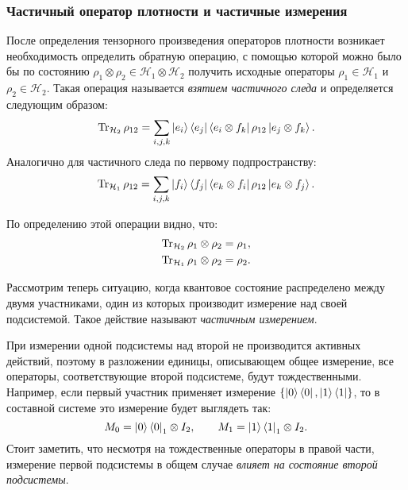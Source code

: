 \subsubsection{Частичный оператор плотности и частичные измерения}
После определения тензорного произведения операторов плотности возникает необходимость определить обратную операцию, с помощью которой можно было бы по состоянию $\rho_1 \otimes \rho_2 \in \mathcal{H}_1 \otimes \mathcal{H}_2$ получить исходные операторы $\rho_1 \in \mathcal{H}_1$ и $\rho_2 \in \mathcal{H}_2$. 
Такая операция называется \textit{взятием частичного следа} и определяется следующим образом:
\begin{equation} \operatorname{Tr}_{\mathcal{H}_2}\rho_{12} = \sum_{i,j,k} \left| e_i \right\rangle\left\langle e_j \right| \left\langle e_i \otimes f_k \right| \rho_{12} \left| e_j \otimes f_k \right\rangle. \end{equation}
Аналогично для частичного следа по первому подпространству:
\begin{equation} \operatorname{Tr}_{\mathcal{H}_1}\rho_{12} = \sum_{i,j,k} \left| f_i \right\rangle\left\langle f_j \right| \left\langle e_k \otimes f_i \right| \rho_{12} \left| e_k \otimes f_j \right\rangle. \end{equation}

По определению этой операции видно, что:
\begin{eqnarray}
\operatorname{Tr}_{\mathcal{H}_2} \rho_1 \otimes \rho_2 = \rho_1, \nonumber\\
\operatorname{Tr}_{\mathcal{H}_1} \rho_1 \otimes \rho_2 = \rho_2.
\end{eqnarray}

Рассмотрим теперь ситуацию, когда квантовое состояние распределено между двумя участниками, один из которых производит измерение над своей подсистемой. Такое действие называют \textit{частичным измерением}.

При измерении одной подсистемы над второй не производится активных действий, поэтому в разложении единицы, описывающем общее измерение, все операторы, соответствующие второй подсистеме, будут тождественными. Например, если первый участник применяет измерение $\{\left| 0 \right\rangle\left\langle 0 \right|, \left| 1 \right\rangle\left\langle 1 \right|\}$, то в составной системе это измерение будет выглядеть так:
\begin{equation}M_0 = \left| 0 \right\rangle\left\langle 0 \right|_1 \otimes I_2,\qquad M_1 = \left| 1 \right\rangle\left\langle 1 \right|_1 \otimes I_2.\end{equation}
Стоит заметить, что несмотря на тождественные операторы в правой части, измерение первой подсистемы в общем случае \textit{влияет на состояние второй подсистемы}.


